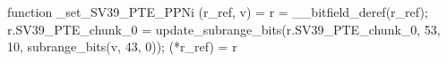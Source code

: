 function _set_SV39_PTE_PPNi (r_ref, v) = {
    r = __bitfield_deref(r_ref);
    r.SV39_PTE_chunk_0 = update_subrange_bits(r.SV39_PTE_chunk_0, 53, 10, subrange_bits(v, 43, 0));
    (*r_ref) = r
}
